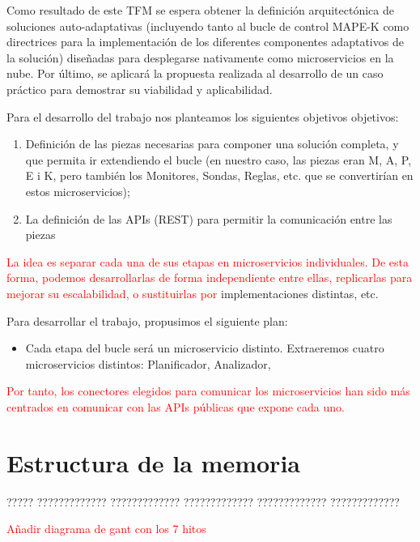 Como resultado de este TFM se espera obtener la definición arquitectónica de soluciones auto-adaptativas (incluyendo tanto al bucle de control MAPE-K como directrices para la implementación de los diferentes componentes adaptativos de la solución) diseñadas para desplegarse nativamente como microservicios en la nube. Por último, se aplicará la propuesta realizada al desarrollo de un caso práctico para demostrar su viabilidad y aplicabilidad.

Para el desarrollo del trabajo nos planteamos los siguientes objetivos objetivos:

\begin{enumerate}
  \item  Definición de las piezas necesarias para componer una solución completa, y que permita ir extendiendo el bucle (en nuestro caso, las piezas eran M, A, P, E i K, pero también los Monitores, Sondas, Reglas, etc. que se convertirían en estos microservicios);

  \item La definición de las APIs (REST) para permitir la comunicación entre las piezas
\end{enumerate}

\textcolor{red}{La idea es separar cada una de sus etapas en microservicios individuales. De esta forma, podemos desarrollarlas de forma independiente entre ellas, replicarlas para mejorar su escalabilidad, o sustituirlas por }implementaciones distintas, etc.

Para desarrollar el trabajo, propusimos el siguiente plan:
\begin{itemize}
  \item Cada etapa del bucle será un microservicio distinto. Extraeremos cuatro microservicios distintos: Planificador, Analizador,
\end{itemize}

\textcolor{red}{Por tanto, los conectores elegidos para comunicar los microservicios han sido más centrados en comunicar con las APIs públicas que expone cada uno.}



\section{Estructura de la memoria}

????? ????????????? ????????????? ????????????? ????????????? ?????????????



\textcolor{red}{Añadir diagrama de gant con los 7 hitos}
